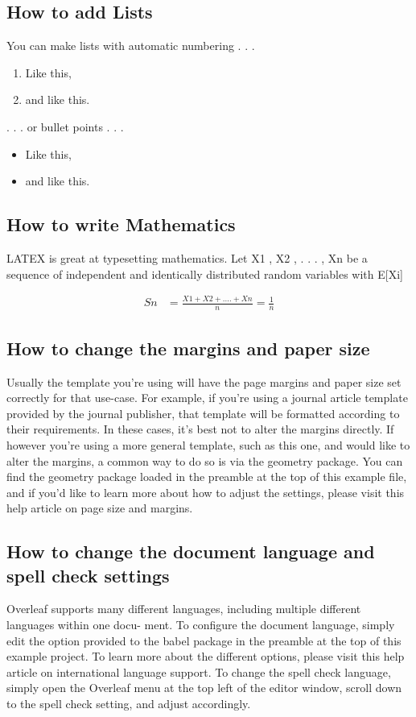 \documentclass{article}
\begin{document}
\subsection{How to add Lists}
You can make lists with automatic numbering . . .\newline
\begin{enumerate}
	\item  Like this,
	\item and like this.
	\end{enumerate}

. . . or bullet points . . .
\begin{itemize}
	\item Like this,
	\item and like this.
	\end{itemize}
	

\subsection{How to write Mathematics}
LATEX is great at typesetting mathematics. Let X1 , X2 , . . . , Xn be a sequence of independent and
identically distributed random variables with E[Xi]\newline

\begin{align*}
   Sn&=\frac{X1+X2+....+Xn}{n}=\frac{1}{n} %
\end{align*}

\subsection{How to change the margins and paper size}
Usually the template you’re using will have the page margins and paper size set correctly for that
use-case. For example, if you’re using a journal article template provided by the journal publisher,
that template will be formatted according to their requirements. In these cases, it’s best not to alter
the margins directly.
If however you’re using a more general template, such as this one, and would like to alter the
margins, a common way to do so is via the geometry package. You can find the geometry package
loaded in the preamble at the top of this example file, and if you’d like to learn more about how to
adjust the settings, please visit this help article on page size and margins.

\subsection{How to change the document language and spell check settings}
Overleaf supports many different languages, including multiple different languages within one docu-
ment.
To configure the document language, simply edit the option provided to the babel package in the
preamble at the top of this example project. To learn more about the different options, please visit
this help article on international language support.
To change the spell check language, simply open the Overleaf menu at the top left of the editor
window, scroll down to the spell check setting, and adjust accordingly.
\end{document}
